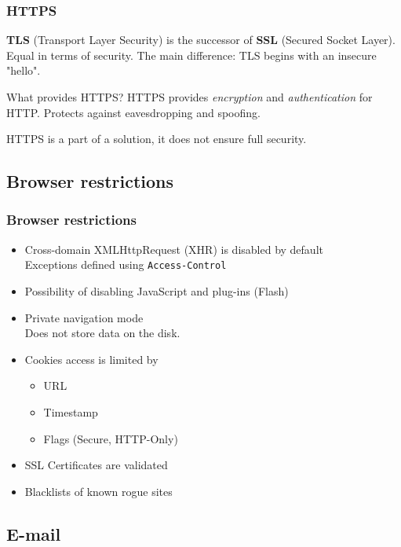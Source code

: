 \begin{frame}
\frametitle{HTTPS}
\textbf{TLS} (Transport Layer Security) is the successor of \textbf{SSL}
(Secured Socket Layer).
Equal in terms of security.
The main difference: TLS begins with an insecure "hello".
\begin{block}{What provides HTTPS?}
HTTPS provides \emph{encryption} and \emph{authentication} for HTTP.
\newline Protects against eavesdropping and spoofing.
\end{block}
\vspace{1em}
HTTPS is a part of a solution, it does not ensure full security.
\end{frame}

\subsection{Browser restrictions}

\begin{frame}
\frametitle{Browser restrictions}
\begin{itemize}
\item Cross-domain XMLHttpRequest (XHR) is disabled by default
	\\ Exceptions defined using \texttt{Access-Control}
\item Possibility of disabling JavaScript and plug-ins (Flash)
\item Private navigation mode
	\\ Does not store data on the disk.
\item Cookies access is limited by
	\begin{itemize}
	\item URL
	\item Timestamp
	\item Flags (Secure, HTTP-Only)
	\end{itemize}
\item SSL Certificates are validated
\item Blacklists of known rogue sites
\end{itemize}
\end{frame}

\subsection{E-mail}

